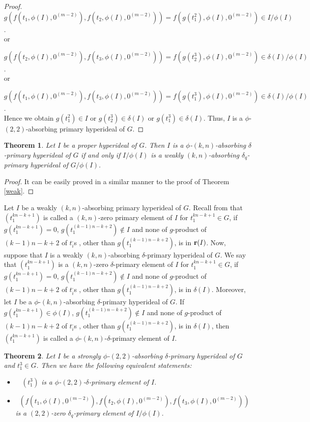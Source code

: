 \documentclass[preprint,review,10pt]{amsart}
\newtheorem{theorem}{Theorem}[section]
\theoremstyle{definition}
\theoremstyle{remark}
\numberwithin{equation}{section}
\begin{document}
\begin{proof}
 $g(f(t_1,\phi(I),0^{(m-2)}),f(t_2,\phi(I),0^{(m-2)}))=f(g(t_1^2),\phi(I),0^{(m-2)}) \in I/\phi(I)$.\\
or 
 
 $g(f(t_2,\phi(I),0^{(m-2)}),f(t_3,\phi(I),0^{(m-2)}))  =f(g(t_2^3),\phi(I),0^{(m-2)}) \in \delta(I)/\phi(I)$.\\
or 
 
$g(f(t_1,\phi(I),0^{(m-2)}),f(t_3,\phi(I),0^{(m-2)})) =f(g(t_1^3),\phi(I),0^{(m-2)})  \in \delta(I)/\phi(I)$.\\
Hence we obtain  $g(t_1^2) \in I$ or $g(t_2^3) \in \delta(I)$ or $g(t_1^3) \in \delta(I)$. Thus, $I$  is   a $\phi$-$(2,2)$-absorbing primary hyperideal of $G$. 
\end{proof}
\begin{theorem} \label{madar}
Let $I$ be a proper hyperideal of $G$. Then $I$  is   a  $\phi$-$(k,n)$-absorbing $\delta$-primary hyperideal of $G$ if and only if   $I/\phi(I)$ is a   weakly $(k,n)$-absorbing $\delta_q$-primary hyperideal of $G/\phi(I)$. 
\end{theorem}
\begin{proof}
It can be easily proved in a similar manner to the proof of Theorem \ref{weak}.
\end{proof}
Let $I$ be a 
weakly $(k,n)$-absorbing primary 
 hyperideal of $G$. Recall from \cite{weak} that $(t_1^{kn-k+1})$ is called a $(k,n)$-zero primary element  of $I$ for $t_1^{kn-k+1} \in G$, if $g(t_1^{kn-k+1})=0$, $g(t_1^{(k-1)n-k+2}) \notin I$ and none of $g$-product of $(k-1)n-k+2$ of $t_i^,$s , other than $g(t_1^{(k-1)n-k+2})$, is in ${\bf r} (I)$. Now, suppose that $I$ is a weakly $(k,n)$-absorbing $\delta$-primary hyperideal of $G$. We say that $(t_1^{kn-k+1})$ is a $(k,n)$-zero $\delta$-primary element of $I$ for $t_1^{kn-k+1} \in G$, if $g(t_1^{kn-k+1})=0$, $g(t_1^{(k-1)n-k+2}) \notin I$ and none of $g$-product of $(k-1)n-k+2$ of $t_i^,$s , other than $g(t_1^{(k-1)n-k+2})$, is in $\delta(I)$. Moreover, let $I$ be a $\phi$-$(k,n)$-absorbing $\delta$-primary hyperideal of $G$. If  $g(t_1^{kn-k+1}) \in \phi(I)$, $g(t_1^{(k-1)n-k+2}) \notin I$ and none of $g$-product of $(k-1)n-k+2$ of $t_i^,$s , other than $g(t_1^{(k-1)n-k+2})$, is in $\delta(I)$, then $(t_1^{kn-k+1})$ is called a $\phi$-$(k,n)$-$\delta$-primary element of $I$.
\begin{theorem} \label{weak2}
Let $I$ be a  strongly $\phi$-$(2,2)$-absorbing $\delta$-primary hyperideal of $G$ and   $t_1^3\in G$. Then we have the following 
equivalent statements:
\begin{itemize}
\item[\rm(i)]~ $(t_1^3)$ is a $\phi$-$(2,2)$-$\delta$-primary element of $I$.
\item[\rm(ii)]~$(f(t_1,\phi(I),0^{(m-2)}),f(t_2,\phi(I),0^{(m-2)}),f(t_3,\phi(I),0^{(m-2)}))$ is a $(2,2)$-zero $\delta_q$-primary element of $I/\phi(I)$.
\end{itemize}
\end{theorem}
\end{document}
